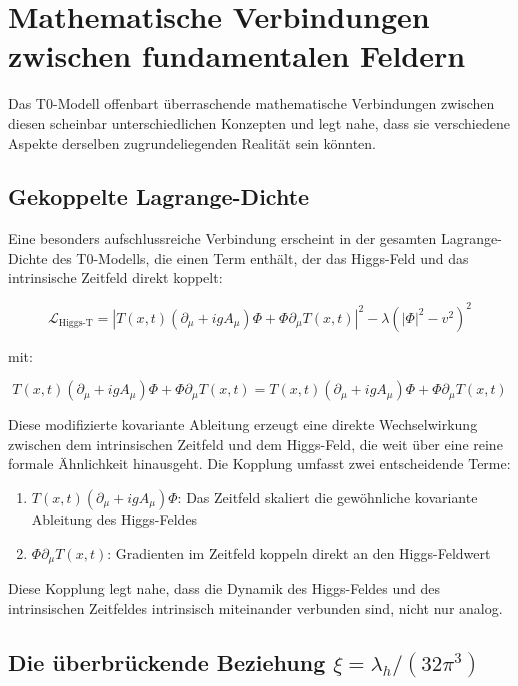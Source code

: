 \documentclass[12pt,a4paper]{article}
\newcommand{\Tfieldt}{T(x,t)}
\newcommand{\DhiggsTt}{\Tfieldt (\partial_\mu + ig A_\mu) \Phi + \Phi \partial_\mu \Tfieldt}
\begin{document}
	\section{Mathematische Verbindungen zwischen fundamentalen Feldern}
	\label{sec:mathematical_connections}
	
	Das T0-Modell offenbart überraschende mathematische Verbindungen zwischen diesen scheinbar unterschiedlichen Konzepten und legt nahe, dass sie verschiedene Aspekte derselben zugrundeliegenden Realität sein könnten.
	
	\subsection{Gekoppelte Lagrange-Dichte}
	\label{subsec:coupled_lagrangian}
	
	Eine besonders aufschlussreiche Verbindung erscheint in der gesamten Lagrange-Dichte des T0-Modells, die einen Term enthält, der das Higgs-Feld und das intrinsische Zeitfeld direkt koppelt:
	
	\begin{equation}
		\mathcal{L}_{\text{Higgs-T}} = |\DhiggsTt|^2 - \lambda(|\Phi|^2 - v^2)^2
	\end{equation}
	
	mit:
	
	\begin{equation}
		\DhiggsTt = \Tfieldt (\partial_\mu + ig A_\mu) \Phi + \Phi \partial_\mu \Tfieldt
	\end{equation}
	
	Diese modifizierte kovariante Ableitung erzeugt eine direkte Wechselwirkung zwischen dem intrinsischen Zeitfeld und dem Higgs-Feld, die weit über eine reine formale Ähnlichkeit hinausgeht. Die Kopplung umfasst zwei entscheidende Terme:
	
	\begin{enumerate}
		\item $\Tfieldt (\partial_\mu + ig A_\mu) \Phi$: Das Zeitfeld skaliert die gewöhnliche kovariante Ableitung des Higgs-Feldes
		\item $\Phi \partial_\mu \Tfieldt$: Gradienten im Zeitfeld koppeln direkt an den Higgs-Feldwert
	\end{enumerate}
	
	Diese Kopplung legt nahe, dass die Dynamik des Higgs-Feldes und des intrinsischen Zeitfeldes intrinsisch miteinander verbunden sind, nicht nur analog.
	
	\subsection{Die überbrückende Beziehung $\xi = \lambda_h/(32\pi^3)$}
	\label{subsec:bridging_relation}
	
\end{document}
